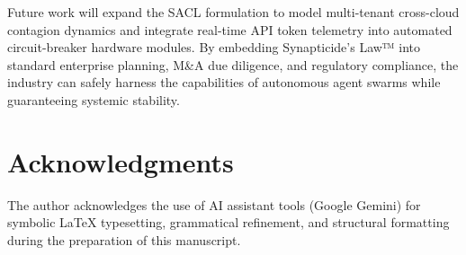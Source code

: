Future work will expand the SACL formulation to model multi-tenant cross-cloud contagion dynamics and integrate real-time API token telemetry into automated circuit-breaker hardware modules. By embedding Synapticide's Law™ into standard enterprise planning, M\&A due diligence, and regulatory compliance, the industry can safely harness the capabilities of autonomous agent swarms while guaranteeing systemic stability.

\section*{Acknowledgments}
The author acknowledges the use of AI assistant tools (Google Gemini) for symbolic \LaTeX{} typesetting, grammatical refinement, and structural formatting during the preparation of this manuscript.